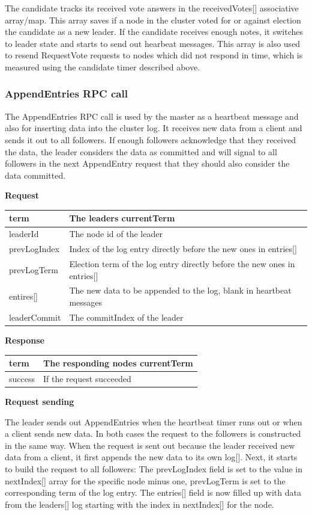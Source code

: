 The candidate tracks its received vote answers in the receivedVotes[] associative array/map. This array
saves if a node in the cluster voted for or against election the candidate as a new leader. If
the candidate receives enough notes, it switches to leader state and starts to send out hearbeat messages. This array is also used to resend RequestVote requests to nodes which did not respond in time,
which is measured using the candidate timer described above.

\subsubsection*{AppendEntries RPC call}
The AppendEntries RPC call is used by the master as a heartbeat message and also for
inserting data into the cluster log. It receives new data from a client and sends it out
to all followers. If enough followers acknowledge that they received the data, the leader
considers the data as committed and will signal to all followers in the next AppendEntry request 
that they should also consider the data committed.

\textbf{Request}

\begin{tabular}{ | l | p{12.7cm} | }
\hline
term & The leaders currentTerm \\ \hline
leaderId & The node id of the leader \\ \hline
prevLogIndex & Index of the log entry directly before the new ones in entries[] \\ \hline
prevLogTerm & Election term of the log entry directly before the new ones in entries[] \\ \hline
entires[] & The new data to be appended to the log, blank in heartbeat messages \\ \hline
leaderCommit & The commitIndex of the leader \\ \hline
\end{tabular}

\textbf{Response}

\begin{tabular}{ | l | p{13.7cm} | }
\hline
term & The responding nodes currentTerm \\ \hline
success & If the request succeeded \\ \hline
\end{tabular}

\textbf{Request sending}

The leader sends out AppendEntries when the heartbeat timer runs out or when a client sends new data. In both cases the request to the followers is constructed in the same way. When the request is sent out because the leader received new data from a client, it first appends the new data to its own log[]. Next, it starts to build the request to all followers: The prevLogIndex field is set to the value in nextIndex[] array for the specific node minus one, prevLogTerm is set to the corresponding term of the log entry. The entries[] field is now filled up with data from the leaders[] log starting with the index in nextIndex[] for the node.


